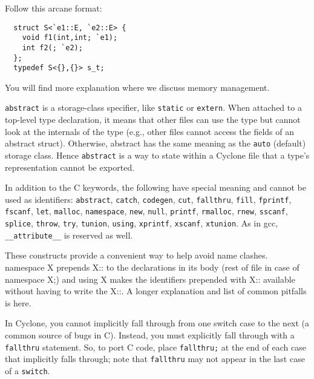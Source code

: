 
Follow this arcane format:
\begin{verbatim}
  struct S<`e1::E, `e2::E> {
    void f1(int,int; `e1);
    int f2(; `e2);
  };
  typedef S<{},{}> s_t;
\end{verbatim}
You will find more explanation where we discuss memory management.


\texttt{abstract} is a storage-class specifier, like \texttt{static}
or \texttt{extern}.  When attached to a top-level type declaration, it
means that other files can use the type but cannot look at the
internals of the type (e.g., other files cannot access the fields of
an abstract struct).  Otherwise, abstract has the same meaning as the
\texttt{auto} (default) storage class.  Hence \texttt{abstract} is a
way to state within a Cyclone file that a type's representation cannot
be exported.


In addition to the C keywords, the following have special meaning and
cannot be used as identifiers: \texttt{abstract}, \texttt{catch},
\texttt{codegen}, \texttt{cut}, \texttt{fallthru}, \texttt{fill},
\texttt{fprintf}, \texttt{fscanf}, \texttt{let}, \texttt{malloc},
\texttt{namespace}, \texttt{new}, \texttt{null}, \texttt{printf},
\texttt{rmalloc}, \texttt{rnew}, \texttt{sscanf}, \texttt{splice},
\texttt{throw}, \texttt{try}, \texttt{tunion}, \texttt{using},
\texttt{xprintf}, \texttt{xscanf}, \texttt{xtunion}.  As in gcc,
\texttt{__attribute__} is reserved as well.


These constructs provide a convenient way to help avoid name clashes.
namespace X prepends X:: to the declarations in its body (rest of file
in case of namespace X;) and using X makes the identifiers prepended
with X:: available without having to write the X::.  A longer
explanation and list of common pitfalls is here.


In Cyclone, you cannot implicitly fall through from one switch case to
the next (a common source of bugs in C).  Instead, you must explicitly
fall through with a \texttt{fallthru} statement.  So, to port C code,
place \texttt{fallthru;} at the end of each case that implicitly falls
through; note that \texttt{fallthru} may not appear in the last case
of a \texttt{switch}.

